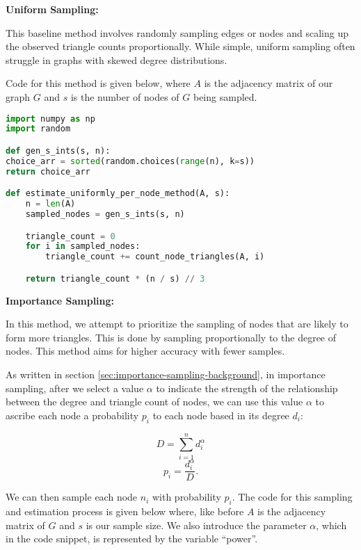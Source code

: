 \documentclass[11pt]{article}
\newcommand{\subsubsubsection}[1]{
  \vspace{1em} %
  \noindent\textbf{#1} %
  \vspace{0.5em} %
}
\begin{document}
\subsubsubsection{Uniform Sampling:}

This baseline method involves randomly sampling edges or nodes and scaling up the observed triangle counts proportionally.
While simple, uniform sampling often struggle in graphs with skewed degree distributions.

Code for this method is given below, where $A$ is the adjacency matrix of our graph $G$ and $s$ is the number of nodes of $G$ being sampled.

\begin{lstlisting}[language=Python]
import numpy as np
import random

def gen_s_ints(s, n):
choice_arr = sorted(random.choices(range(n), k=s))
return choice_arr

def estimate_uniformly_per_node_method(A, s):
    n = len(A)
    sampled_nodes = gen_s_ints(s, n)

    triangle_count = 0
    for i in sampled_nodes:
        triangle_count += count_node_triangles(A, i)

    return triangle_count * (n / s) // 3

\end{lstlisting}

\textbf{Importance Sampling:}

In this method, we attempt to prioritize the sampling of nodes that are likely to form more triangles.
This is done by sampling proportionally to the degree of nodes.
This method aims for higher accuracy with fewer samples.


As written in section \ref{sec:importance-sampling-background}, in importance sampling, after we select a value $\alpha$ to indicate the strength of the relationship between the degree and triangle count of nodes, we can use this value $\alpha$ to ascribe each node a probability $p_i$ to each node based in its degree $d_i$:

\[
D = \sum_{i = 1}^{n} d_i^\alpha
\]
\[
p_i = \frac{d_i^\alpha}{D}.
\]

We can then sample each node $n_i$ with probability $p_i$.
The code for this sampling and estimation process is given below where, like before $A$ is the adjacency matrix of $G$ and $s$ is our sample size.
We also introduce the parameter $\alpha$, which in the code snippet, is represented by the variable ``power''.
\end{document}
